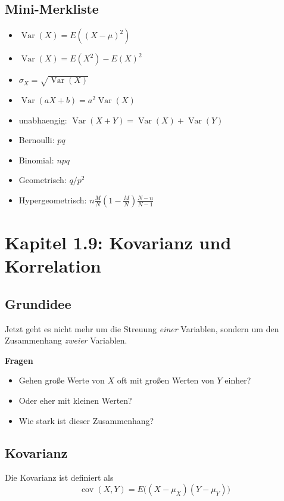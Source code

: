 \documentclass[a4paper,11pt]{article}
\begin{document}
\subsection{Mini-Merkliste}
\begin{itemize}
  \item $\displaystyle \operatorname{Var}(X)=E((X-\mu)^2)$
  \item $\displaystyle \operatorname{Var}(X)=E(X^2)-E(X)^2$
  \item $\displaystyle \sigma_X=\sqrt{\operatorname{Var}(X)}$
  \item $\displaystyle \operatorname{Var}(aX+b)=a^2\operatorname{Var}(X)$
  \item unabhaengig: $\displaystyle \operatorname{Var}(X+Y)=\operatorname{Var}(X)+\operatorname{Var}(Y)$
  \item Bernoulli: $\displaystyle pq$
  \item Binomial: $\displaystyle npq$
  \item Geometrisch: $\displaystyle q/p^2$
  \item Hypergeometrisch: $\displaystyle n\frac{M}{N}(1-\frac{M}{N})\frac{N-n}{N-1}$
\end{itemize}

\section{Kapitel 1.9: Kovarianz und Korrelation}

\subsection{Grundidee}
Jetzt geht es nicht mehr um die Streuung \emph{einer} Variablen, sondern um den Zusammenhang \emph{zweier} Variablen.

\textbf{Fragen}
\begin{itemize}
  \item Gehen große Werte von $X$ oft mit großen Werten von $Y$ einher?
  \item Oder eher mit kleinen Werten?
  \item Wie stark ist dieser Zusammenhang?
\end{itemize}

\subsection{Kovarianz}
Die Kovarianz ist definiert als
\[
\operatorname{cov}(X,Y)=E\big((X-\mu_X)(Y-\mu_Y)\big)
\]
\end{document}
